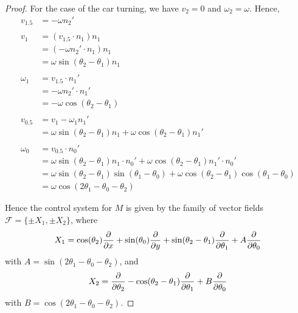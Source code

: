 \documentclass{article}
\begin{document}
\begin{proof}
For the case of the car turning, we have $v_2 = 0$ and $\omega_2 = \omega$. Hence,
\begin{align*}
v_{1.5} & =  -\omega n_2'
\\
\\ v_1 & =  (v_{1.5} \cdot n_1) n_1
\\ & =  (-\omega n_2' \cdot n_1) n_1
\\ & = \omega \sin(\theta_2 - \theta_1) n_1
\\
\\ \omega_1 & =  v_{1.5} \cdot n_1'
\\ & = - \omega n_2' \cdot n_1'
\\ & =  -\omega \cos(\theta_2 - \theta_1)
\\
\\ v_{0.5} & =  v_1  - \omega_1 n_1'
\\ & = \omega \sin(\theta_2 - \theta_1) n_1 + \omega \cos(\theta_2 - \theta_1) n_1'
\\
\\  \omega_0 & = v_{0.5} \cdot n_0'
\\ & = \omega \sin(\theta_2 - \theta_1) n_1 \cdot n_0' + \omega \cos(\theta_2 - \theta_1) n_1' \cdot n_0'
\\ & = \omega \sin(\theta_2 - \theta_1) \sin(\theta_1 - \theta_0) + \omega \cos(\theta_2 - \theta_1) \cos(\theta_1 - \theta_0)
\\ & = \omega \cos(2 \theta_1 - \theta_0 - \theta_2)
\end{align*}

Hence the control system for $M$ is given by the family of vector fields $\mathcal F = \{\pm X_1, \pm X_2\}$, where
$$X_1 = \cos(\theta_2) \frac{\partial}{\partial x}  + \sin(\theta_0) \frac{\partial}{\partial y}  + \sin(\theta_2 - \theta_1)  \frac{\partial}{\partial\theta_1} + A \frac{\partial}{\partial\theta_0}$$
with $A = \sin(2 \theta_1 - \theta_0 - \theta_2)$,
and
$$X_2 =  \frac{\partial}{\partial\theta_2} - \cos(\theta_2 - \theta_1) \frac{\partial}{\partial\theta_1} + B \frac{\partial}{\partial\theta_0}$$
with $B = \cos(2 \theta_1 - \theta_0 - \theta_2)$.
\end{proof}
\end{document}
